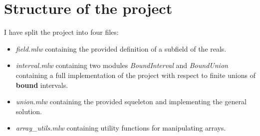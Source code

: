 \section*{Structure of the project}
I have split the project into four files:
\begin{itemize}
  \item \textit{field.mlw} containing the provided definition of a subfield of the
    reals.
  \item \textit{interval.mlw} containing two modules \textit{BoundInterval} and
    \textit{BoundUnion} containing a full implementation of the project with respect
    to finite unions of \textbf{bound} intervals.
  \item \textit{union.mlw} containing the provided squeleton and implementing the
    general solution.
  \item \textit{array\_utils.mlw} containing utility functions for manipulating
    arrays.
\end{itemize}

%
%
